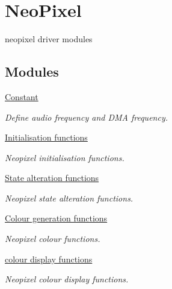 \hypertarget{group___neo_pixel}{}\section{Neo\+Pixel}
\label{group___neo_pixel}


neopixel driver modules  


\subsection*{Modules}
\begin{DoxyCompactItemize}
\item 
\hyperlink{group___constant}{Constant}
\begin{DoxyCompactList}\small\item\em Define audio frequency and D\+MA frequency. \end{DoxyCompactList}\item 
\hyperlink{group___neo_pixel___init}{Initialisation functions}
\begin{DoxyCompactList}\small\item\em Neopixel initialisation functions. \end{DoxyCompactList}\item 
\hyperlink{group___neo_pixel___state}{State alteration functions}
\begin{DoxyCompactList}\small\item\em Neopixel state alteration functions. \end{DoxyCompactList}\item 
\hyperlink{group___neo_pixel___colour}{Colour generation functions}
\begin{DoxyCompactList}\small\item\em Neopixel colour functions. \end{DoxyCompactList}\item 
\hyperlink{group___neo_pixel___display}{colour display functions}
\begin{DoxyCompactList}\small\item\em Neopixel colour display functions. \end{DoxyCompactList}\end{DoxyCompactItemize}
